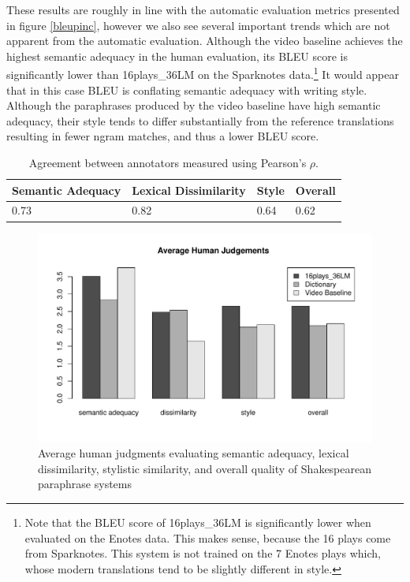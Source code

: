 \documentclass[10pt,a5paper,twoside]{article}
\begin{document}
These results are roughly in line with the automatic evaluation metrics presented in figure \ref{bleupinc}, however we also see several important
trends which are not apparent from the automatic evaluation.
Although the video baseline achieves the highest semantic adequacy in the human evaluation, its BLEU score
is significantly lower than 16plays\_36LM on the Sparknotes data.\footnote{
Note that the BLEU score of 16plays\_36LM is significantly lower when evaluated on the Enotes data.  This makes sense, because the 
16 plays come from Sparknotes. This system is not trained on the 7 Enotes plays which, whose modern translations tend
to be slightly different in style.}
It would appear that in this case BLEU is conflating semantic adequacy with writing style.  Although the paraphrases produced 
by the video baseline have high semantic adequacy, their style tends to differ substantially from the reference translations resulting
in fewer ngram matches, and thus a lower BLEU score.

\begin{table}
  \begin{center}
    \begin{tabular}{|l|l|l|l|}
      \hline
      Semantic Adequacy & Lexical Dissimilarity & Style & Overall \\
      \hline
      \hline
      0.73 & 0.82 & 0.64 & 0.62 \\
      \hline
    \end{tabular}
  \end{center}
  \caption{Agreement between annotators measured using Pearson's $\rho$.}
  \label{annotator_agreement}
\end{table}

\begin{figure}[ht]
  \begin{center}
    \includegraphics[width=5in]{figures/human_judgements.pdf}
  \end{center}
  \caption{Average human judgments evaluating semantic adequacy, lexical dissimilarity, stylistic similarity, and overall quality
    of Shakespearean paraphrase systems} 
  \label{human_judgements}
\end{figure}
\end{document}
